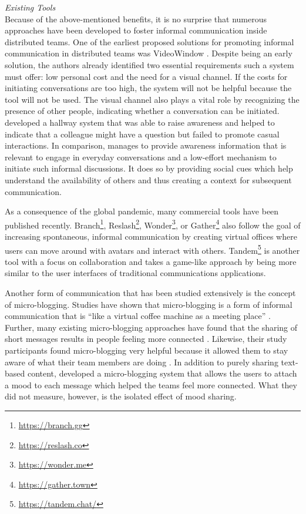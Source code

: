 \medskip\noindent\textit{Existing Tools} \\
Because of the above-mentioned benefits, it is no surprise that numerous approaches have been developed to foster informal communication inside distributed teams. One of the earliest proposed solutions for promoting informal communication in distributed teams was VideoWindow \autocite{fish1990videowindow}. Despite being an early solution, the authors already identified two essential requirements such a system must offer: low personal cost and the need for a visual channel. If the costs for initiating conversations are too high, the system will not be helpful because the tool will not be used. The visual channel also plays a vital role by recognizing the presence of other people, indicating whether a conversation can be initiated. \textcite{sasaki1999video} developed a hallway system that was able to raise awareness and helped to indicate that a colleague might have a question but failed to promote casual interactions. In comparison, \textcite{lou2012presencescape} manages to provide awareness information that is relevant to engage in everyday conversations and a low-effort mechanism to initiate such informal discussions. It does so by providing social cues which help understand the availability of others and thus creating a context for subsequent communication.

As a consequence of the global pandemic, many commercial tools have been published recently. Branch\footnote{\url{https://branch.gg}}, Reslash\footnote{\url{https://reslash.co}}, Wonder\footnote{\url{https://wonder.me}}, or Gather\footnote{\url{https://gather.town}} also follow the goal of increasing spontaneous, informal communication by creating virtual offices where users can move around with avatars and interact with others. Tandem\footnote{\url{https://tandem.chat/}} is another tool with a focus on collaboration and takes a game-like approach by being more similar to the user interfaces of traditional communications applications.

Another form of communication that has been studied extensively is the concept of micro-blogging. Studies have shown that micro-blogging is a form of informal communication \autocite{ehrlich2010microblogging} that is \enquote{like a virtual coffee machine as a meeting place} \autocite[p.~158]{ebner2008microblogging}. Further, many existing micro-blogging approaches have found that the sharing of short messages results in people feeling more connected \autocite{ehrlich2010microblogging, zhang2010case}. Likewise, their study participants found micro-blogging very helpful because it allowed them to stay aware of what their team members are doing \autocite{zhang2010case}. In addition to purely sharing text-based content, \textcite{dullemond2013fixing} developed a micro-blogging system that allows the users to attach a mood to each message which helped the teams feel more connected. What they did not measure, however, is the isolated effect of mood sharing.

